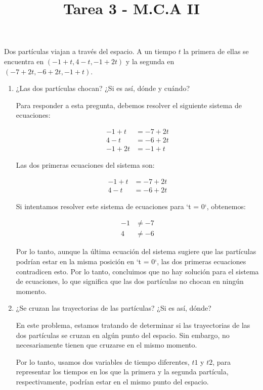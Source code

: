 \documentclass{article}
\title{Tarea 3 - M.C.A II}
\begin{document}
\maketitle


Dos partículas viajan a través del espacio. A un tiempo \( t \) la primera de ellas se encuentra en
\((-1 + t, 4 - t, -1 + 2t)\) y la segunda en \((-7 + 2t, -6 + 2t, -1 + t)\).

\begin{enumerate}
\item ¿Las dos partículas chocan? ¿Si es así, dónde y cuándo?

Para responder a esta pregunta, debemos resolver el siguiente sistema de ecuaciones:

\begin{align*}
-1 + t &= -7 + 2t \\
4 - t &= -6 + 2t \\
-1 + 2t &= -1 + t
\end{align*}

Las dos primeras ecuaciones del sistema son:

\begin{align*}
-1 + t &= -7 + 2t \\
4 - t &= -6 + 2t
\end{align*}

Si intentamos resolver este sistema de ecuaciones para `t = 0`, obtenemos:

\begin{align*}
-1 &\neq -7 \\
4 &\neq -6
\end{align*}

Por lo tanto, aunque la última ecuación del sistema sugiere que las partículas podrían estar en la misma posición en `t = 0`, las dos primeras ecuaciones contradicen esto. Por lo tanto, concluimos que no hay solución para el sistema de ecuaciones, lo que significa que las dos partículas no chocan en ningún momento.

\item ¿Se cruzan las trayectorias de las partículas? ¿Si es así, dónde?

En este problema, estamos tratando de determinar si las trayectorias de las dos partículas se cruzan en algún punto del espacio. Sin embargo, no necesariamente tienen que cruzarse en el mismo momento. 

Por lo tanto, usamos dos variables de tiempo diferentes, \( t1 \) y \( t2 \), para representar los tiempos en los que la primera y la segunda partícula, respectivamente, podrían estar en el mismo punto del espacio. 


\end{enumerate}
\end{document}
